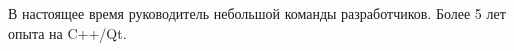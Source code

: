 

\begin{cvparagraph}

В настоящее время руководитель небольшой команды разработчиков. Более 5 лет опыта на C++/Qt. 
\end{cvparagraph}
